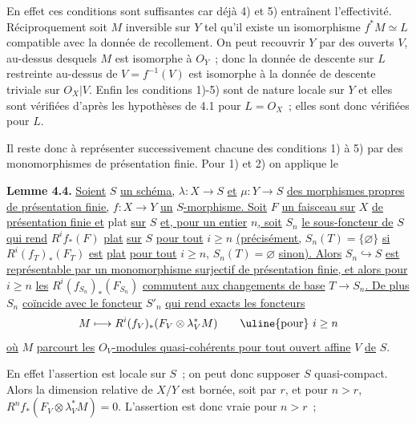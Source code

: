 
En
effet ces conditions sont suffisantes car déjà 4) et 5) entraînent l'effectivité. Réciproquement soit \(M\) inversible sur \(Y\) tel qu'il existe un isomorphisme \(f^*M\simeq L\) compatible avec la donnée de recollement. On peut recouvrir \(Y\) par des ouverts \(V\), au-dessus desquels \(M\) est isomorphe à \({O}_Y\)~; donc la donnée de descente sur \(L\) restreinte au-dessus de \(V=f^{-1}(V)\) est isomorphe à la donnée de descente triviale sur \({O}_X|V\). Enfin les conditions 1)-5) sont de nature locale sur \(Y\) et elles sont vérifiées d'après les hypothèses de 4.1 pour \(L={O}_X\)~; elles sont donc vérifiées pour \(L\).

Il reste donc à représenter successivement chacune des conditions 1) à 5) par des monomorphismes de présentation finie. Pour 1) et 2) on applique le

\textbf{Lemme 4.4.} \uline{Soient} \(S\) \uline{un schéma,} \(\lambda:X\to S\) \uline{et} \(\mu:Y\to S\) \uline{des morphismes propres de présentation finie,} \(f:X\to Y\) \uline{un} \(S\)\uline{-morphisme. Soit} \(F\) \uline{un faisceau sur} \(X\) \uline{de présentation finie et} plat \uline{sur} \(S\) \uline{et, pour un entier} \(n\)\uline{, soit} \(S_n\) \uline{le sous-foncteur de} \(S\) \uline{qui rend} \(R^if_*(F)\) \uline{plat} \uline{sur} \(S\) \uline{pour tout} \(i\ge n\) \uline{(précisément,} \(S_n(T)=\{\varnothing\}\) \uline{si} \(R^i(f_T)_*(F_T)\) \uline{est} \uline{plat} \uline{pour tout} \(i\ge n\), \(S_n(T)=\varnothing\) \uline{sinon). Alors} \(S_n\hookrightarrow S\) \uline{est représentable par un monomorphisme surjectif de présentation finie, et alors pour} \(i\ge n\) \uline{les} \(R^i(f_{S_n})_*(F_{S_n})\) \uline{commutent aux changements de base} \(T\to S_n\)\uline{. De plus} \(S_n\) \uline{coïncide avec le foncteur} \(S'_n\) \uline{qui rend exacts les foncteurs}
\[
  M\longmapsto R^i(f_V)_*(F_V\otimes\lambda_V^*M)\qquad \text{\uline{pour} } i\ge n
\]
\uline{où} \(M\) \uline{parcourt les} \({O}_V\)\uline{-modules quasi-cohérents pour tout ouvert affine} \(V\) \uline{de} \(S\).

En effet l'assertion est locale sur \(S\)~; on peut donc supposer \(S\) quasi-compact. Alors la dimension relative de \(X/Y\) est bornée, soit par \(r\), et pour \(n>r\), \(R^nf_*(F_V\otimes\lambda_V^*M)=0\). L'assertion est donc vraie pour \(n>r\)~;
